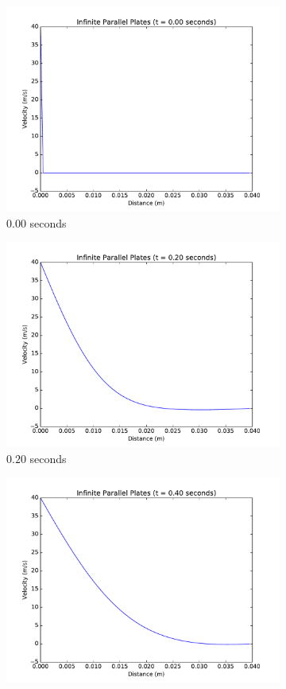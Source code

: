 \documentclass[addpoints]{exam}
\begin{document}
\begin{questions}
\begin{parts}
\begin{solution}
\begin{figure}[H]
\begin{subfigure}{.5\textwidth}
  \centering
  \includegraphics[width=.8\linewidth]{figs/0-00_sec_plot_FIT.pdf}
  \caption{$0.00$ seconds}
  \label{fig:0.0_forward}
\end{subfigure}%
\begin{subfigure}{.5\textwidth}
  \centering
  \includegraphics[width=.8\linewidth]{figs/0-20_sec_plot_FIT.pdf}
  \caption{$0.20$ seconds}
  \label{fig:0.2_forward}
\end{subfigure}
\begin{subfigure}{.5\textwidth}
  \centering
  \includegraphics[width=.8\linewidth]{figs/0-40_sec_plot_FIT.pdf}

\end{subfigure}
\end{figure}
\end{solution}
\end{parts}
\end{questions}
\end{document}
